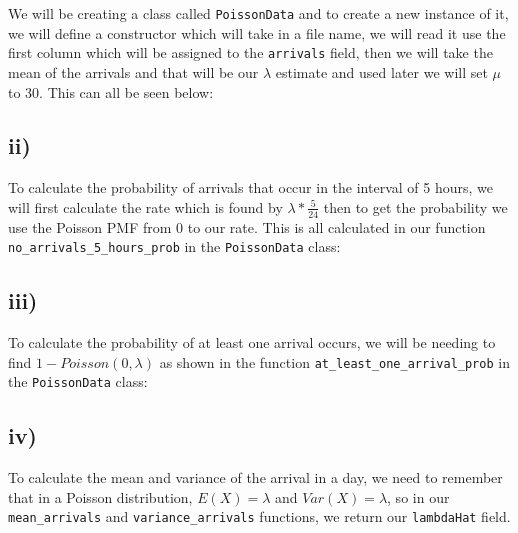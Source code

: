 \documentclass[11pt, letterpaper]{article}
\begin{document}
We will be creating a class called \verb|PoissonData| and to create a new
instance of it, we will define a constructor
which will take in a file name, we will read it use the first column which will
be assigned to the \verb|arrivals| field,
then we will take the mean of the arrivals and that will be our $\lambda$
estimate and used later we will set $\mu$ to 30.
This can all be seen below:

\begin{file}[q5.py i)]
	
\end{file}

\subsection*{ii)}

To calculate the probability of  arrivals that occur in the interval of 5
hours, we will first calculate the rate
which is found by $\lambda * \frac{5}{24}$ then to get the probability we use
the Poisson PMF from $0$ to our rate.
This is all calculated in our function \verb|no_arrivals_5_hours_prob| in the
\verb|PoissonData| class:

\begin{file}[q5.py ii)]
	
\end{file}

\subsection*{iii)}
To calculate the probability of at least one arrival occurs, we will be needing
to find $1-Poisson(0,\lambda)$ as
shown in the function \verb|at_least_one_arrival_prob| in the
\verb|PoissonData| class:

\begin{file}[q5.py iii)]
	
\end{file}

\subsection*{iv)}
To calculate the mean and variance of the arrival in a day, we need to remember
that in a Poisson distribution,
$E(X) = \lambda$ and $Var(X) = \lambda$, so in our \verb|mean_arrivals| and
\verb|variance_arrivals| functions, we
return our \verb|lambdaHat| field.

\begin{file}[q5.py]
	
\end{file}
\end{document}
